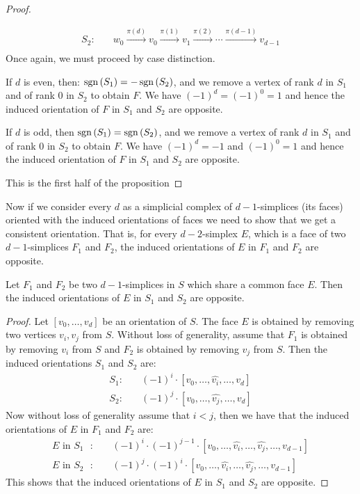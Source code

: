 \begin{proof}
\begin{case}{2}
\begin{align*}
			S_2: & \quad w_0 \xrightarrow{\pi(d)} v_0 \xrightarrow{\pi(1)} v_1 \xrightarrow{\pi(2)} \cdots \xrightarrow{\pi(d-1)} v_{d-1} \\
		\end{align*}
		Once again, we must proceed by case distinction.
		\begin{case}{2.1}
			If $d$ is even, then: $\operatorname{sgn}\left(S_1\right) = - \operatorname{sgn}\left(S_2\right)$, and we remove a vertex of rank $d$ in $S_1$ and of rank $0$ in $S_2$ to obtain $F$. We have $(-1)^d = (-1)^0 = 1$ and hence the induced orientation of $F$ in $S_1$ and $S_2$ are opposite.
		\end{case}
		\begin{case}{2.2}
			If $d$ is odd, then $\operatorname{sgn}\left(S_1\right) = \operatorname{sgn}\left(S_2\right)$, and we remove a vertex of rank $d$ in $S_1$ and of rank $0$ in $S_2$ to obtain $F$. We have $(-1)^d = -1$ and $(-1)^0 = 1$ and hence the induced orientation of $F$ in $S_1$ and $S_2$ are opposite.
		\end{case}
	\end{case}
	This is the first half of the proposition
\end{proof}

 Now if we consider every $d$ as a simplicial complex of $d-1$-simplices (its faces) oriented with the induced orientations of faces we need to show that we get a consistent orientation. That is, for every $d-2$-simplex $E$, which is a face of two $d-1$-simplices $F_1$ and $F_2$, the induced orientations of $E$ in $F_1$ and $F_2$ are opposite.

\begin{claim}
	\label{claim:opposite_orientations}
	Let $F_1$ and $F_2$ be two $d-1$-simplices in $S$ which share a common face $E$. Then the induced orientations of $E$ in $S_1$ and $S_2$ are opposite.
\end{claim}
\begin{proof}
	Let $[v_0, \dots, v_{d}]$ be an orientation of $S$. The face $E$ is obtained by removing two vertices $v_i, v_j$ from $S$. Without loss of generality, assume that $F_1$ is obtained by removing $v_i$ from $S$ and $F_2$ is obtained by removing $v_j$ from $S$. Then the induced orientations $S_1$ and $S_2$ are:
	\begin{align*}
		S_1: \quad & (-1)^i \cdot [v_0, \dots, \hat{v_i}, \dots, v_{d}] \\
		S_2: \quad & (-1)^j \cdot [v_0, \dots, \hat{v_j}, \dots, v_{d}]
	\end{align*}
	Now without loss of generality assume that $i < j$, then we have that the induced orientations of $E$ in $F_1$ and $F_2$ are:
	\begin{align*}
		\text{$E$ in $S_1$ }: \quad & (-1)^i \cdot (-1)^{j-1} \cdot [v_0, \dots, \hat{v_i}, \dots, \hat{v_j}, \dots, v_{d-1}] \\
		\text{$E$ in $S_2$ }: \quad & (-1)^j \cdot (-1)^i \cdot [v_0, \dots, \hat{v_i}, \dots, \hat{v_j}, \dots, v_{d-1}]
	\end{align*}
	This shows that the induced orientations of $E$ in $S_1$ and $S_2$ are opposite.
\end{proof}

